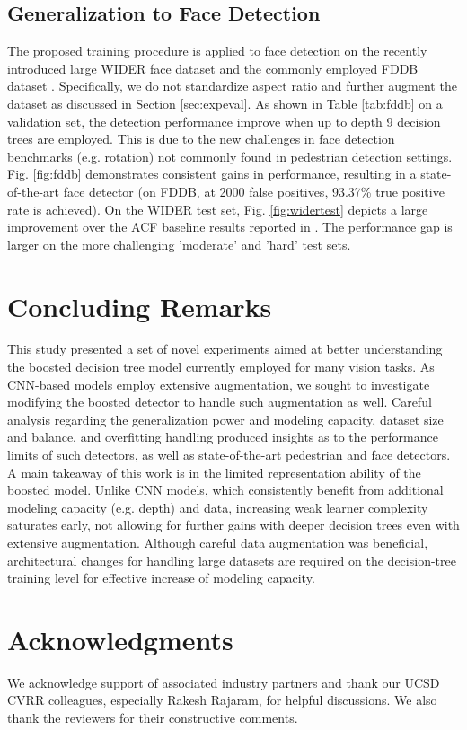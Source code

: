 \documentclass[a4paper,conference]{IEEEtran_icpr}
\begin{document}
\subsection{Generalization to Face Detection}
\label{sec:faces}
The proposed training procedure is applied to face detection on the recently introduced large WIDER face dataset \cite{wider} and the commonly employed FDDB dataset \cite{fddbTech}. Specifically, we do not standardize aspect ratio and further augment the dataset as discussed in Section \ref{sec:expeval}. As shown in Table \ref{tab:fddb} on a validation set, the detection performance improve when up to depth 9 decision trees are employed. This is due to the new challenges in face detection benchmarks (e.g. rotation) not commonly found in pedestrian detection settings. Fig. \ref{fig:fddb} demonstrates consistent gains in performance, resulting in a state-of-the-art face detector (on FDDB, at 2000 false positives, 93.37\% true positive rate is achieved). On the WIDER test set, Fig. \ref{fig:widertest} depicts a large improvement over the ACF baseline results reported in \cite{wider}. The performance gap is larger on the more challenging 'moderate' and 'hard' test sets.


\section{Concluding Remarks}

This study presented a set of novel experiments aimed at better understanding the boosted decision tree model currently employed for many vision tasks. As CNN-based models employ extensive augmentation, we sought to investigate modifying the boosted detector to handle such augmentation as well. Careful analysis regarding the generalization power and modeling capacity, dataset size and balance, and overfitting handling produced insights as to the performance limits of such detectors, as well as state-of-the-art pedestrian and face detectors. A main takeaway of this work is in the limited representation ability of the boosted model. Unlike CNN models, which consistently benefit from additional modeling capacity (e.g. depth) and data, increasing weak learner complexity saturates early, not allowing for further gains with deeper decision trees even with extensive augmentation. Although careful data augmentation was beneficial, architectural changes for handling large datasets are required on the decision-tree training level for effective increase of modeling capacity.


\section{Acknowledgments}
We acknowledge support of associated industry partners and thank our UCSD CVRR colleagues, especially Rakesh Rajaram, for helpful discussions. We also thank the reviewers for their constructive comments.

 
\end{document}
